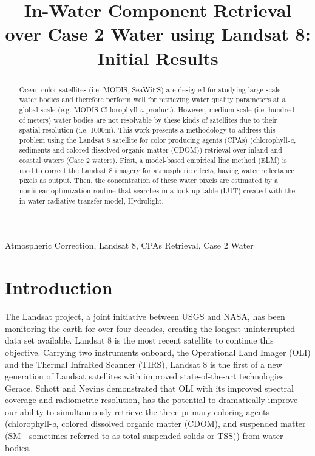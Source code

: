 \documentclass{article}
\title{In-Water Component Retrieval over Case 2 Water using Landsat 8:\\ Initial Results}
\begin{document}
%
\maketitle
%
\begin{abstract}
Ocean color satellites (i.e. MODIS, SeaWiFS) are designed for studying large-scale water bodies and therefore perform well for retrieving water quality parameters at a global scale (e.g. MODIS Chlorophyll-{\it a} product). However, medium scale (i.e. hundred of meters) water bodies are not resolvable by these kinds of satellites due to their spatial resolution (i.e. 1000m). This work presents a methodology to address this problem using the Landsat 8 satellite for color producing agents (CPAs) (chlorophyll-{\it a}, sediments and colored dissolved organic matter (CDOM)) retrieval over inland and coastal waters (Case 2 waters). First, a model-based empirical line method (ELM) is used to correct the Landsat 8 imagery for atmospheric effects, having water reflectance pixels as output. Then, the concentration of these water pixels are estimated by a nonlinear optimization routine that searches in a look-up table (LUT) created with the in water radiative transfer model, Hydrolight.
\end{abstract}
%
\begin{keywords}
Atmospheric Correction, Landsat 8, CPAs Retrieval, Case 2 Water
\end{keywords}
%
\section{Introduction}
\label{sec:intro}

The Landsat project, a joint initiative between USGS and NASA, has been monitoring the earth for over four decades, creating the longest uninterrupted data set available. Landsat 8 is the most recent satellite to continue this objective. Carrying two instruments onboard, the Operational Land Imager (OLI) and the Thermal InfraRed Scanner (TIRS), Landsat 8 is the first of a new generation of Landsat satellites with improved state-of-the-art technologies. Gerace, Schott and Nevins \cite{Gerace:2013} demonstrated that OLI with its improved spectral coverage and radiometric resolution, has the potential to dramatically improve our ability to simultaneously retrieve the three primary coloring agents (chlorophyll-{\it a}, colored dissolved organic matter (CDOM), and suspended matter (SM - sometimes referred to as total suspended solids or TSS)) from water bodies.
\end{document}
